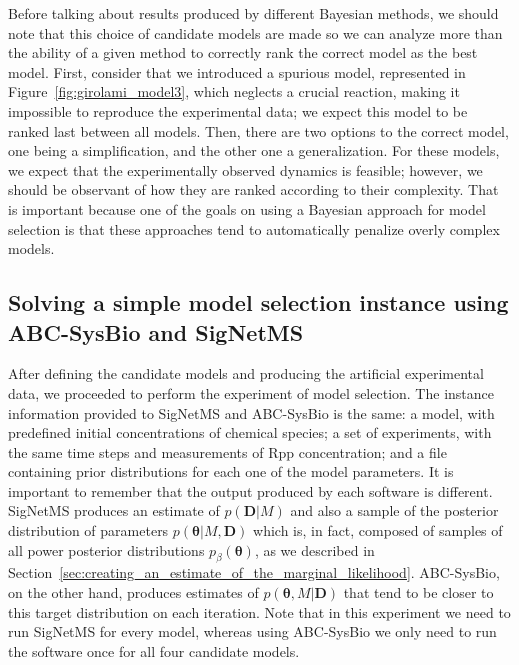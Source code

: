 
Before talking about results produced by different Bayesian methods, we should
note that this choice of candidate models are made so we can analyze
more than the ability of a given method to correctly rank the correct
model as the best model. First, consider that we introduced a spurious
model, represented in Figure~\ref{fig:girolami_model3}, which neglects a
crucial reaction, making it impossible to reproduce the experimental
data; we expect this model to be ranked last between all models. Then,
there are two options to the correct model, one being a simplification, and
the other one a generalization. For these models, we expect that the experimentally observed dynamics is feasible; however, we should be observant of how they are ranked according to their complexity. That is important
because one of the goals on using a Bayesian approach for model 
selection is that these approaches tend to automatically penalize overly
complex models.

\subsection{Solving a simple model selection instance using ABC-SysBio
and SigNetMS}

After defining the candidate models and producing the artificial
experimental data, we proceeded to perform the experiment of model
selection. The instance information provided to SigNetMS and ABC-SysBio 
is the same: a model, with predefined initial concentrations of chemical 
species; a set of experiments, with the same time steps and measurements of Rpp concentration; and a file containing prior
distributions for each one of the model parameters. It is important to
remember that the output produced by each software is different.
SigNetMS produces an estimate of $p({\bm D} | M)$ and also a sample of
the posterior distribution of parameters $p({\bm \theta} | M, {\bm D})$
which is, in fact, composed of samples of all power posterior
distributions $p_{\beta}({\bm \theta})$, as we described
in Section~\ref{sec:creating_an_estimate_of_the_marginal_likelihood}.
ABC-SysBio, on the other hand, produces estimates of $p({\bm
\theta}, M | {\bm D})$ that tend to be closer to this target 
distribution on each iteration. Note that in this experiment we need to
run SigNetMS for every model, whereas using ABC-SysBio we only need to run 
the software once for all four candidate models.

